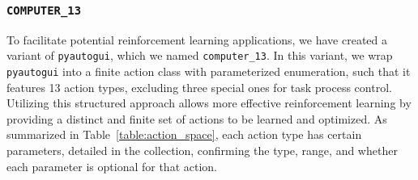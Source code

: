 \subsubsection{\texttt{COMPUTER\_13}}
To facilitate potential reinforcement learning applications, we have created a variant of \texttt{pyautogui}, which we named \texttt{computer\_13}. 
In this variant, we wrap \texttt{pyautogui} into a finite action class with parameterized enumeration, such that it features 13 action types, excluding three special ones for task process control. 
Utilizing this structured approach allows more effective reinforcement learning by providing a distinct and finite set of actions to be learned and optimized.
As summarized in Table~\ref{table:action_space}, each action type has certain parameters, detailed in the collection, confirming the type, range, and whether each parameter is optional for that action.

